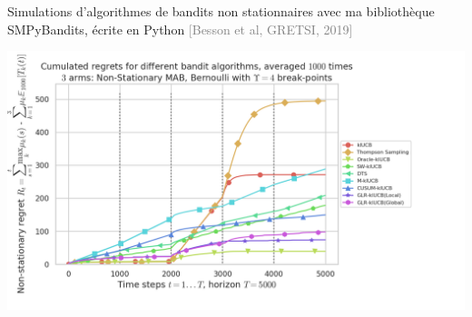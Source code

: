\documentclass[11pt,english,ignorenonframetext,]{beamer}
\begin{document}




\begin{frame}[plain]{\normalsize Simulations d'algorithmes de bandits \alert{non stationnaires} avec ma bibliothèque SMPyBandits, écrite en Python \hfill{}\textcolor{gray}{[Besson et al, GRETSI, 2019]}}

  \centering
  \includegraphics[width=1.15\textwidth]{figures/example_regret_non_stationary_bandits.png}

\end{frame}


\end{document}
